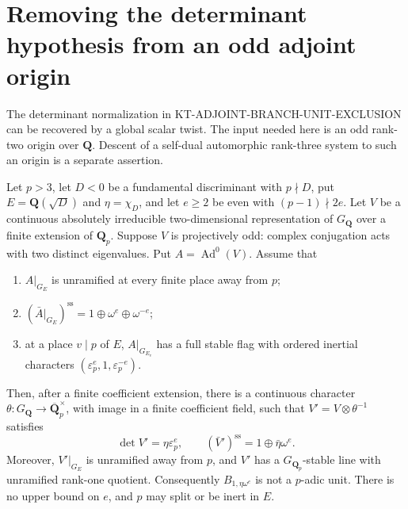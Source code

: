 \section{Removing the determinant hypothesis from an odd adjoint origin}
\label{sec:kt-odd-adjoint-scalar-normalization}

The determinant normalization in
KT-ADJOINT-BRANCH-UNIT-EXCLUSION can be recovered by a global scalar
twist.  The input needed here is an odd rank-two origin over
$\mathbf Q$.  Descent of a self-dual automorphic rank-three system to
such an origin is a separate assertion.

\begin{theorem}
Let $p>3$, let $D<0$ be a fundamental discriminant with $p\nmid D$,
put $E=\mathbf Q(\sqrt D)$ and $\eta=\chi_D$, and let $e\ge2$ be
even with $(p-1)\nmid2e$.  Let $V$ be a continuous absolutely
irreducible two-dimensional representation of $G_{\mathbf Q}$ over
a finite extension of $\mathbf Q_p$.  Suppose $V$ is projectively
odd: complex conjugation acts with two distinct eigenvalues.
Put $A=\operatorname{Ad}^0(V)$.  Assume that
\begin{enumerate}
\item $A|_{G_E}$ is unramified at every finite place away from $p$;
\item $(\bar A|_{G_E})^{\mathrm{ss}}
       =1\oplus\omega^e\oplus\omega^{-e}$;
\item at a place $v\mid p$ of $E$, $A|_{G_{E_v}}$ has a full stable
      flag with ordered inertial characters
      $(\varepsilon_p^e,1,\varepsilon_p^{-e})$.
\end{enumerate}
Then, after a finite coefficient extension, there is a continuous
character $\theta:G_{\mathbf Q}\to\overline{\mathbf Q}_p^{\times}$,
with image in a finite coefficient field, such that
$V'=V\otimes\theta^{-1}$ satisfies
\[
 \det V'=\eta\varepsilon_p^e,\qquad
 (\bar V')^{\mathrm{ss}}=1\oplus\bar\eta\omega^e.       \tag{SN.1}
\]
Moreover, $V'|_{G_E}$ is unramified away from $p$, and $V'$ has a
$G_{\mathbf Q_p}$-stable line with unramified rank-one quotient.
Consequently $B_{1,\eta\omega^e}$ is not a $p$-adic unit.
There is no upper bound on $e$, and $p$ may split or be inert in $E$.
\end{theorem}

